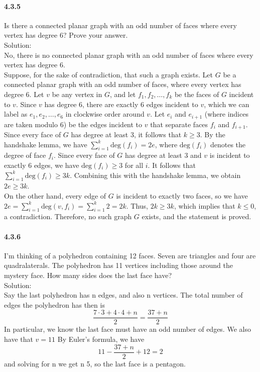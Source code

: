 \documentclass{article}
\begin{document}
\paragraph{4.3.5}
Is there a connected planar graph with an odd number of faces where every vertex has degree 6? Prove your answer.\\
Solution:\\
No, there is no connected planar graph with an odd number of faces where every vertex has degree 6.\\
Suppose, for the sake of contradiction, that such a graph exists. Let $G$ be a connected planar graph with an odd number of faces, where every vertex has degree 6. Let $v$ be any vertex in $G$, and let $f_1, f_2, \dots, f_k$ be the faces of $G$ incident to $v$. Since $v$ has degree 6, there are exactly 6 edges incident to $v$, which we can label as $e_1, e_2, \dots, e_6$ in clockwise order around $v$. Let $e_i$ and $e_{i+1}$ (where indices are taken modulo 6) be the edges incident to $v$ that separate faces $f_i$ and $f_{i+1}$.\\
Since every face of $G$ has degree at least 3, it follows that $k\geq 3$. By the handshake lemma, we have $\sum_{i=1}^k \text{deg}(f_i) = 2e$, where $\text{deg}(f_i)$ denotes the degree of face $f_i$. Since every face of $G$ has degree at least 3 and $v$ is incident to exactly 6 edges, we have $\text{deg}(f_i)\geq 3$ for all $i$. It follows that $\sum_{i=1}^k \text{deg}(f_i)\geq 3k$. Combining this with the handshake lemma, we obtain $2e\geq 3k$.\\
On the other hand, every edge of $G$ is incident to exactly two faces, so we have $2e = \sum_{i=1}^k \text{deg}(v,f_i) = \sum_{i=1}^k 2 = 2k$. Thus, $2k\geq 3k$, which implies that $k\leq 0$, a contradiction. Therefore, no such graph $G$ exists, and the statement is proved.
\paragraph{4.3.6}
I’m thinking of a polyhedron containing 12 faces. Seven are triangles and four are quadralaterals. The polyhedron has 11 vertices including those around the mystery face. How many sides does the last face have?\\
Solution:\\
Say the last polyhedron has n edges, and also n vertices. The total number of edges the polyhedron has then is
$$\frac{7\cdot 3+4\cdot 4+n}{2}=\frac{37+n}{2}$$
In particular, we know the last face must have an odd number of edges. We also have that $v=11$ By Euler’s formula, we have $$11-\frac{37+n}{2}+12=2$$
and solving for n we get n  5, so the last face is a pentagon.
\end{document}
